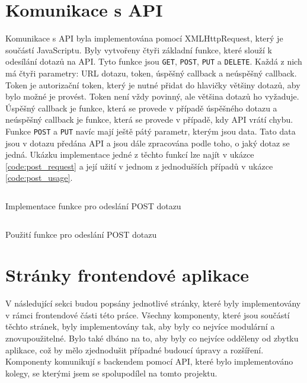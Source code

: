 \section{Komunikace s API}
Komunikace s API byla implementována pomocí XMLHttpRequest, který je součástí JavaScriptu. Byly vytvořeny čtyři základní funkce, které slouží k odesílání dotazů na API. Tyto funkce jsou \texttt{GET}, \texttt{POST}, \texttt{PUT} a \texttt{DELETE}. Každá z nich má čtyři parametry: URL dotazu, token, úspěšný callback a neúspěšný callback. Token je autorizační token, který je nutné přidat do hlavičky většiny dotazů, aby bylo možné je provést. Token není vždy povinný, ale většina dotazů ho vyžaduje. Úspěšný callback je funkce, která se provede v případě úspěšného dotazu a neúspěšný callback je funkce, která se provede v případě, kdy API vrátí chybu. Funkce \texttt{POST} a \texttt{PUT} navíc mají ještě pátý parametr, kterým jsou data. Tato data jsou v dotazu předána API a jsou dále zpracována podle toho, o jaký dotaz se jedná. Ukázku implementace jedné z těchto funkcí lze najít v ukázce \ref{code:post_request} a její užití v jednom z jednodušších případů v ukázce \ref{code:post_usage}.

\begin{listing}[H]
  \inputminted[breaklines]{typescript}{resources/code/post_request.ts}
  \caption{Implementace funkce pro odeslání POST dotazu}
  \label{code:post_request}
\end{listing}

\begin{listing}[H]
  \inputminted[breaklines]{typescript}{resources/code/post_usage.ts}
  \caption{Použití funkce pro odeslání POST dotazu}
  \label{code:post_usage}
\end{listing}

\section{Stránky frontendové aplikace}
V následující sekci budou popsány jednotlivé stránky, které byly implementovány v rámci frontendové části této práce. Všechny komponenty, které jsou součástí těchto stránek, byly implementovány tak, aby byly co nejvíce modulární a znovupoužitelné. Bylo také dbáno na to, aby byly co nejvíce odděleny od zbytku aplikace, což by mělo zjednodušit případné budoucí úpravy a rozšíření. Komponenty komunikují s backendem pomocí API, které bylo implementováno kolegy, se kterými jsem se spolupodílel na tomto projektu.

